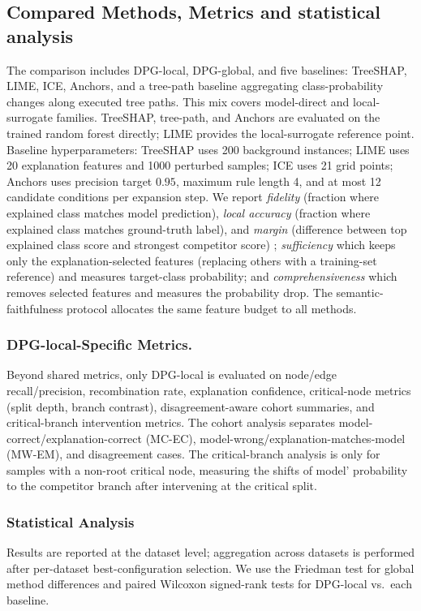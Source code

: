 \documentclass[runningheads]{llncs}
\begin{document}
\subsection{Compared Methods, Metrics and statistical analysis}
The comparison includes DPG-local, DPG-global, and five baselines: TreeSHAP, LIME, ICE, Anchors, and a tree-path baseline aggregating class-probability changes along executed tree paths. This mix covers model-direct and local-surrogate families. TreeSHAP, tree-path, and Anchors are evaluated on the trained random forest directly; LIME provides the local-surrogate reference point.
Baseline hyperparameters: TreeSHAP uses 200 background instances; LIME uses 20 explanation features and 1000 perturbed samples; ICE uses 21 grid points; Anchors uses precision target $0.95$, maximum rule length 4, and at most 12 candidate conditions per expansion step.
We report \emph{fidelity} (fraction where explained class matches model prediction), \emph{local accuracy} (fraction where explained class matches ground-truth label), and \emph{margin} (difference between top explained class score and strongest competitor score) \cite{vilone2021notions,nauta2023anecdotal,doshi2017rigorous,miller2019explanation}; \emph{sufficiency}  which keeps only the explanation-selected features (replacing others with a training-set reference) and measures target-class probability; and \emph{comprehensiveness} \cite{nauta2023anecdotal} which removes selected features and measures the probability drop. The semantic-faithfulness protocol allocates the same feature budget to all methods.

\subsubsection{DPG-local-Specific Metrics.}
Beyond shared metrics, only DPG-local is evaluated on node/edge recall\slash precision, recombination rate, explanation confidence, critical-node metrics (split depth, branch contrast), disagreement-aware cohort summaries, and critical-branch intervention metrics. The cohort analysis separates model-correct/explanation-correct (MC-EC), model-wrong/explanation-matches-model (MW-EM), and disagreement cases. The critical-branch analysis is only for samples with a non-root critical node, measuring the shifts of model' probability to the competitor branch after intervening at the critical split.

\subsubsection{Statistical Analysis}
Results are reported at the dataset level; aggregation across datasets is performed after per-dataset best-configuration selection. We use the Friedman test for global method differences and paired Wilcoxon signed-rank tests for DPG-local vs.\ each baseline.
\end{document}
